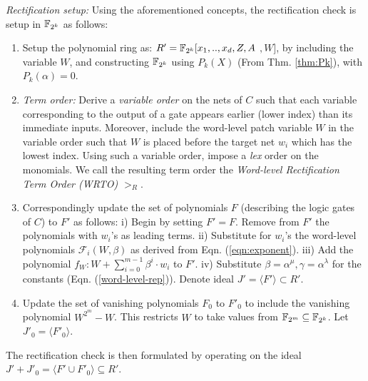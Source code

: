 {\it Rectification setup:} Using the aforementioned concepts, the
rectification check is setup in ${\mathbb{F}}_{2^k}$ as follows: 

\begin{enumerate}
\item Setup the polynomial ring as: $R'={\mathbb{F}}_{2^k}[x_1,..,x_d,Z,A$ $,W]$,
  by including the variable $W$, and constructing ${\mathbb{F}}_{2^k}$ using $P_k(X)$
  (From Thm. \ref{thm:Pk}), with $P_k(\alpha)=0$. 
\item 
  {\it Term order:} Derive a {\it variable order} on the nets of $C$
  such that each variable corresponding to the output of a gate
  appears earlier (lower index) than its immediate inputs. Moreover,
  include the word-level patch variable $W$ in the variable order such
  that $W$ is placed before the target net $w_i$ which has the lowest
  index. Using such a variable order, impose a {\it lex} order on
  the monomials. We call the resulting term order the {\it Word-level
    Rectification Term Order (WRTO)} $>_R$.  
\item Correspondingly update the set of polynomials $F$ (describing the
  logic gates of $C$) to $F'$ as follows: i) Begin by setting
  $F'=F$. Remove from $F'$ the polynomials with $w_i$'s as leading
  terms.
  ii) Substitute for $w_i$'s the word-level polynomials
  $\mathcal{F}_i(W,\beta)$ as  derived from
  Eqn. (\ref{eqn:exponent}). iii) Add the polynomial $f_W: W +
  \sum_{i=0}^{m-1}\beta^{i} \cdot w_i$ to $F'$. iv) Substitute 
  $\beta = \alpha^{\mu}, \gamma=\alpha^{\lambda}$ for the constants
  (Eqn. (\ref{word-level-rep})). Denote ideal $J'=\langle F'\rangle
  \subset R'$.
\item Update the set of vanishing polynomials $F_0$ to $F'_0$ to
  include the vanishing polynomial $W^{2^m}-W$. This restricts $W$ to
  take values from ${\mathbb{F}}_{2^m}\subseteq{\mathbb{F}}_{2^k}$. Let $J'_0=\langle F'_0\rangle$.
\end{enumerate}

The rectification check is then formulated by operating on the
ideal $J'+J'_0=\langle F' \cup F'_0\rangle \subseteq R'$.

